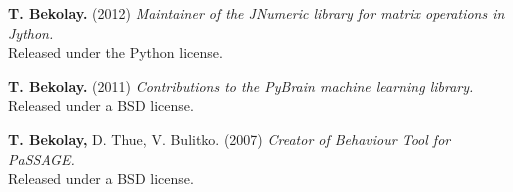 \documentclass[line,margin]{res}
\begin{document}
\begin{resume}
\textbf{T. Bekolay.} (2012)
  {\sl Maintainer of the JNumeric library for matrix operations in Jython.} \\
  Released under the Python license.

\textbf{T. Bekolay.} (2011)
  {\sl Contributions to the PyBrain machine learning library.} \\
  Released under a BSD license.

\textbf{T. Bekolay,} D. Thue, V. Bulitko. (2007)
  {\sl Creator of Behaviour Tool for PaSSAGE.} \\
  Released under a BSD license.

\label{LastPage}
\end{resume}
\end{document}
